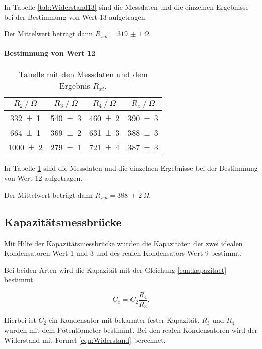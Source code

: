 In Tabelle \ref{tab:Widerstand13} sind die Messdaten und die einzelnen
Ergebnisse bei der Bestimmung von Wert 13 aufgetragen.

Der Mittelwert beträgt dann $R_{xm} = \SI{319(1)}{\Omega}$.

\FloatBarrier
\paragraph{Bestimmung von Wert 12}

\begin{table}
  \centering
  \caption{Tabelle mit den Messdaten und dem Ergebnis $R_{xi}$.}
  \label{tab:Widerstand12}
  \begin{tabular}{c c c c}
    \toprule
    $R_2 \ /\ \si{\Omega}$ & $R_3 \ /\ \si{\Omega}$ & $R_4 \ /\ \si{\Omega}$ & $R_x \ /\ \si{\Omega}$\\
    \midrule
    \num{332 +- 1} & \num{540 +- 3} & \num{460 +- 2} & \num{390 +- 3}\\
    \num{664 +- 1} & \num{369 +- 2} & \num{631 +- 3} & \num{388 +- 3}\\
    \num{1000 +- 2} & \num{279 +- 1} & \num{721 +- 4} & \num{387 +- 3}\\
    \bottomrule
  \end{tabular}
\end{table}

In Tabelle \ref{tab:Widerstand12} sind die Messdaten und die einzelnen
Ergebnisse bei der Bestimmung von Wert 12 aufgetragen.

Der Mittelwert beträgt dann $R_{xm} = \SI{388(2)}{\Omega}$.

\subsection{Kapazitätsmessbrücke}

Mit Hilfe der Kapazitätsmessbrücke wurden die Kapazitäten
der zwei idealen Kondensatoren Wert 1 und 3 und des realen
Kondensators Wert 9 bestimmt.

Bei beiden Arten wird die Kapazität mit der Gleichung \eqref{eqn:kapazitaet}
bestimmt.

\begin{equation}
  C_x = C_2\frac{R_4}{R_3}.
  \label{eqn:kapazitaet}
\end{equation}

Hierbei ist $C_2$ ein Kondensator mit bekannter fester Kapazität. $R_3$ und
$R_4$ wurden mit dem Potentiometer bestimmt.
Bei den realen Kondensatoren wird  der Widerstand mit Formel
\eqref{eqn:Widerstand} berechnet.

